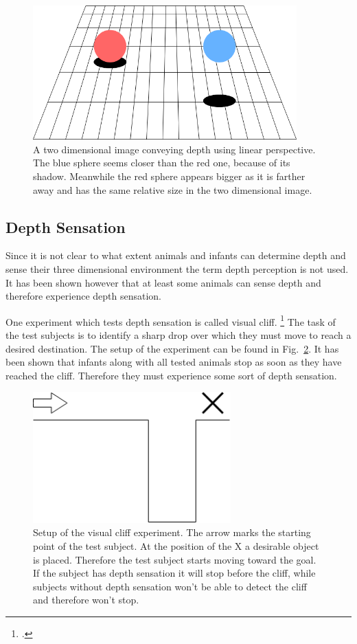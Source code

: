 \begin{figure}[h!]
	\centering
	\includegraphics[width=4in]{img/study_of_literature_depth_perception_two_shperes.png}
	\caption{A two dimensional image conveying depth using linear perspective. The blue sphere seems closer than the red one, because of its shadow. Meanwhile the red sphere appears bigger as it is farther away and has the same relative size in the two dimensional image.}
	\label{pic:study_of_literature_depth_perception_two_shperes}
\end{figure}

\subsection{Depth Sensation}
Since it is not clear to what extent animals and infants can determine depth and sense their three dimensional environment the term depth perception is not used. It has been shown however that at least some animals can sense depth and therefore experience depth sensation.

One experiment which tests depth sensation is called visual cliff. \footcite{Gibson_The_visual_cliff} The task of the test subjects is to identify a sharp drop over which they must move to reach a desired destination. The setup of the experiment can be found in Fig.~\ref{pic:study_of_literature_depth_perception_depth_sensation_visual_cliff}. It has been shown that infants along with all tested animals stop as soon as they have reached the cliff. Therefore they must experience some sort of depth sensation.

\begin{figure}[h!]
	\centering
	\includegraphics[width=3in]{img/study_of_literature_depth_perception_depth_sensation_visual_cliff.png}
	\caption{Setup of the visual cliff experiment. The arrow marks the starting point of the test subject. At the position of the X a desirable object is placed. Therefore the test subject starts moving toward the goal. If the subject has depth sensation it will stop before the cliff, while subjects without depth sensation won't be able to detect the cliff and therefore won't stop.}
	\label{pic:study_of_literature_depth_perception_depth_sensation_visual_cliff}
\end{figure}

\filbreak